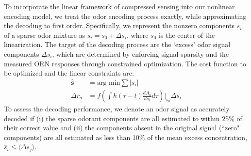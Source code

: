 To incorporate the linear framework of compressed sensing into our nonlinear encoding model, we treat the odor encoding process exactly, while approximating the decoding to first order. Specifically, we represent the nonzero components $s_i$ of a  sparse odor mixture as $s_i = s_0 + \Delta s_i$, where $s_0$ is the center of the linearization. The target of the decoding process are the `excess' odor signal components $\Delta s_i$, which are determined by enforcing signal sparsity and the measured ORN responses through constrained optimization. The cost function to be optimized and the linear constraints are:
\begin{align}
\hat {\mathbf s} &= \text{arg min} \sum |s_i| \\
\Delta r_a &= {f}\left(\int h(\tau - t)\frac{dA_a}{ds_i}d \tau\right) \bigg |_{s_0} \Delta s_i
\end{align}
To assess the decoding performance, we denote an odor signal as accurately decoded if (i) the sparse odorant components are all estimated to within 25\% of their correct value and (ii) the components absent in the original signal (``zero" components) are all estimated as less than 10\% of the mean excess concentration, $\hat s_i \le \langle \Delta s_j \rangle$. 





